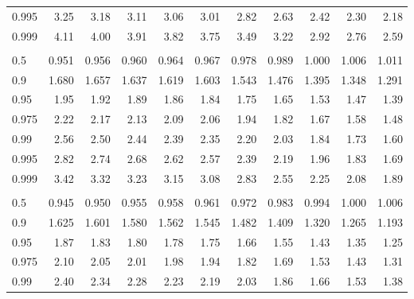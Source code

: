 \documentclass[]{article}
\begin{document}
\begin{table}[H]
\begin{tabular}{lrrrrrrrrrr}
\hspace{1em}0.995 & 3.25 & 3.18 & 3.11 & 3.06 & 3.01 & 2.82 & 2.63 & 2.42 & 2.30 & 2.18\\
\hspace{1em}0.999 & 4.11 & 4.00 & 3.91 & 3.82 & 3.75 & 3.49 & 3.22 & 2.92 & 2.76 & 2.59\\
\addlinespace[0.3em]
\multicolumn{11}{l}{\textbf{$k_2=60$}}\\
\hspace{1em}0.5 & 0.951 & 0.956 & 0.960 & 0.964 & 0.967 & 0.978 & 0.989 & 1.000 & 1.006 & 1.011\\
\hspace{1em}0.9 & 1.680 & 1.657 & 1.637 & 1.619 & 1.603 & 1.543 & 1.476 & 1.395 & 1.348 & 1.291\\
\hspace{1em}0.95 & 1.95 & 1.92 & 1.89 & 1.86 & 1.84 & 1.75 & 1.65 & 1.53 & 1.47 & 1.39\\
\hspace{1em}0.975 & 2.22 & 2.17 & 2.13 & 2.09 & 2.06 & 1.94 & 1.82 & 1.67 & 1.58 & 1.48\\
\hspace{1em}0.99 & 2.56 & 2.50 & 2.44 & 2.39 & 2.35 & 2.20 & 2.03 & 1.84 & 1.73 & 1.60\\
\hspace{1em}0.995 & 2.82 & 2.74 & 2.68 & 2.62 & 2.57 & 2.39 & 2.19 & 1.96 & 1.83 & 1.69\\
\hspace{1em}0.999 & 3.42 & 3.32 & 3.23 & 3.15 & 3.08 & 2.83 & 2.55 & 2.25 & 2.08 & 1.89\\
\addlinespace[0.3em]
\multicolumn{11}{l}{\textbf{$k_2=120$}}\\
\hspace{1em}0.5 & 0.945 & 0.950 & 0.955 & 0.958 & 0.961 & 0.972 & 0.983 & 0.994 & 1.000 & 1.006\\
\hspace{1em}0.9 & 1.625 & 1.601 & 1.580 & 1.562 & 1.545 & 1.482 & 1.409 & 1.320 & 1.265 & 1.193\\
\hspace{1em}0.95 & 1.87 & 1.83 & 1.80 & 1.78 & 1.75 & 1.66 & 1.55 & 1.43 & 1.35 & 1.25\\
\hspace{1em}0.975 & 2.10 & 2.05 & 2.01 & 1.98 & 1.94 & 1.82 & 1.69 & 1.53 & 1.43 & 1.31\\
\hspace{1em}0.99 & 2.40 & 2.34 & 2.28 & 2.23 & 2.19 & 2.03 & 1.86 & 1.66 & 1.53 & 1.38\\

\end{tabular}
\end{table}
\end{document}
